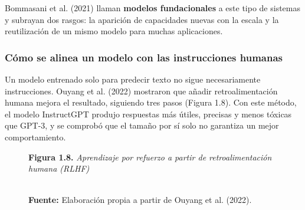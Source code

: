 Bommasani et al. (2021) llaman \textbf{modelos fundacionales} a este tipo de sistemas y subrayan dos rasgos: la aparición de capacidades nuevas con la escala y la reutilización de un mismo modelo para muchas aplicaciones.

\subsubsection{Cómo se alinea un modelo con las instrucciones humanas}
Un modelo entrenado solo para predecir texto no sigue necesariamente instrucciones. Ouyang et al. (2022) mostraron que añadir retroalimentación humana mejora el resultado, siguiendo tres pasos (Figura 1.8). Con este método, el modelo InstructGPT produjo respuestas más útiles, precisas y menos tóxicas que GPT-3, y se comprobó que el tamaño por sí solo no garantiza un mejor comportamiento.

\begin{figure}[htpb!]
\centering
\begin{tcolorbox}[colback=white, colframe=unmsm_gold, arc=3pt, boxrule=0.8pt, top=0.3cm, bottom=0.3cm, left=0.4cm, right=0.4cm]
\centering
\small\sffamily
\textbf{Figura 1.8.} \textit{Aprendizaje por refuerzo a partir de retroalimentación humana (RLHF)}\\[0.25cm]
\\[0.2cm]
\raggedright\scriptsize \textbf{Fuente:} Elaboración propia a partir de Ouyang et al. (2022).
\end{tcolorbox}
\end{figure}

